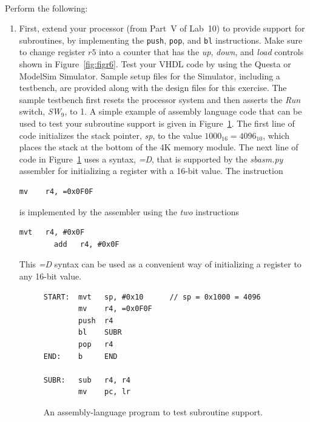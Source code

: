 \documentclass[epsfig,10pt,fullpage]{article} \addtolength{\textwidth}{1.5in}
\begin{document}
~\\
\noindent
Perform the following:
\begin{enumerate}
\item First, extend your processor (from Part~V of Lab~10) to
provide support for subroutines, by implementing the \texttt{push}, \texttt{pop}, 
and \texttt{bl} instructions. Make sure to change register $r5$ into a counter that 
has the {\it up}, {\it down}, and {\it load} controls shown in Figure~\ref{fig:figr6}.
Test your VHDL code by using the Questa or ModelSim Simulator. Sample 
setup files for the Simulator, including a testbench, are provided 
along with the design files for this exercise.  The sample testbench first resets the processor
system and then asserts the {\it Run} switch, {\it SW}$_9$, to 1. 
A simple example of assembly language code that can be used to test your subroutine support is 
given in Figure~\ref{fig:subr}. The first line of code initializes the stack pointer, {\it sp},
to the value $1000_{16} = 4096_{10}$, which places the stack at the bottom of the 4K memory 
module. The next line of code in Figure~\ref{fig:subr} uses a syntax, {\it =D}, that is supported 
by the {\it sbasm.py} assembler for initializing a register with a 16-bit value. The instruction

\begin{lstlisting}[name=subr]
        mv    r4, =0x0F0F
\end{lstlisting}

is implemented by the assembler using the {\it two} instructions

\begin{lstlisting}[name=subr]
        mvt   r4, #0x0F
        add   r4, #0x0F
\end{lstlisting}

This {\it =D} syntax can be used as a convenient way of initializing a register to 
any 16-bit value. 

\lstset{language=ASM,numbers=none,escapechar=|}
\begin{figure}[]
\begin{center}
\begin{minipage}[H]{12.5 cm}
\begin{lstlisting}[name=subr]
START:  mvt   sp, #0x10      // sp = 0x1000 = 4096
        mv    r4, =0x0F0F    
        push  r4
        bl    SUBR
        pop   r4
END:    b     END

SUBR:   sub   r4, r4
        mv    pc, lr
\end{lstlisting}
\end{minipage}
\caption{An assembly-language program to test subroutine support.}
\label{fig:subr}
\end{center}
\end{figure}


\end{enumerate}
\end{document}
